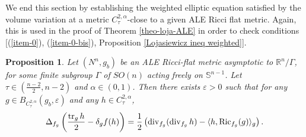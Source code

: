 \documentclass[a4paper,11pt,reqno]{amsart}
\newtheorem{prop}[defn]{Proposition}
\def\RR{\mathbb{R}}
\def\Ric{\mathop{\rm Ric}\nolimits}
\def\tr{\mathop{\rm tr}\nolimits}
\def\div{\mathop{\rm div}\nolimits}
\def\Ric{\mathop{\rm Ric}\nolimits}
\def\tr{\mathop{\rm tr}\nolimits}
\def\div{\mathop{\rm div}\nolimits}
\numberwithin{equation}{section}
\begin{document}
		We end this section by establishing the weighted elliptic equation satisfied by the volume variation at a metric $C^{2,\alpha}_{\tau}$-close to a given ALE Ricci flat metric.
		Again, this is used in the proof of Theorem \ref{theo-loja-ALE} in order to check conditions [(\ref{item-0}), (\ref{item-0-bis}), Proposition \ref{Lojasiewicz ineq weighted}].   
	\begin{prop}\label{var-vol-var-ell-eqn-prop}
		Let $(N^n,g_b)$ be an ALE Ricci-flat metric asymptotic to $\RR^n\slash\Gamma$, for some finite subgroup $\Gamma$ of $SO(n)$ acting freely on $\mathbb{S}^{n-1}$. Let $\tau\in(\frac{n-2}{2},n-2)$ and $\alpha\in(0,1)$. Then there exists $\varepsilon>0$ such that for any $g\in B_{C^{2,\alpha}_{\tau}}(g_b,\varepsilon)$ and any $h\in C^{2,\alpha}_{\tau}$,
		\begin{equation}
		\begin{split}\label{var-vol-var-ell-eqn-for}
		\Delta_{f_g}\left(\frac{\tr_gh}{2}-\delta_gf(h)\right)=\frac{1}{2}\left(\div_{f_g}(\div_{f_g}h)-\langle h,\Ric_{f_g}(g)\rangle_g\right).
		\end{split}
		\end{equation}
		\end{prop}
\end{document}
